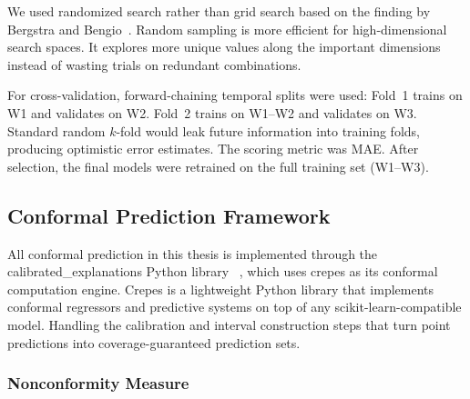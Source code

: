 \documentclass[12pt, a4paper, oneside]{report}
\begin{document}
We used randomized search rather than grid search based on the finding by Bergstra and Bengio~\cite{bergstra2012random}. Random sampling is more efficient for high-dimensional search spaces. It explores more unique values along the important dimensions instead of wasting trials on redundant combinations.

For cross-validation, forward-chaining temporal splits were used: Fold~1 trains on W1 and validates on W2. Fold~2 trains on W1--W2 and validates on W3. Standard random $k$-fold would leak future information into training folds, producing optimistic error estimates. The scoring metric was MAE. After selection, the final models were retrained on the full training set (W1--W3).

\subsection{Conformal Prediction Framework}
\label{subsec:conformal_prediction}



All conformal prediction in this thesis is implemented through the calibrated\_explanations Python library ~\cite{lofstrom2024calibrated}, which uses crepes as its conformal computation engine. Crepes is a lightweight Python library that implements conformal regressors and predictive systems on top of any scikit-learn-compatible model. Handling the calibration and interval construction steps that turn point predictions into coverage-guaranteed prediction sets.

\subsubsection{Nonconformity Measure}
\end{document}
